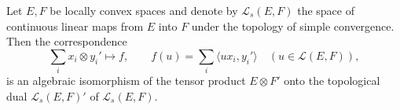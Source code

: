 Let $E, F$ be locally convex spaces and denote by $\mathcal{L}_s(E, F)$ the space of continuous linear maps from $E$ into $F$ under the topology of simple convergence. Then the correspondence
$$\sum_i x_i \otimes y_i' \longmapsto f, \qquad f(u) = \sum_i \langle u x_i, y_i' \rangle \quad (u \in \mathcal{L}(E, F)),$$
is an algebraic isomorphism of the tensor product $E \otimes F'$ onto the topological dual $\mathcal{L}_s(E, F)'$ of $\mathcal{L}_s(E, F)$.
